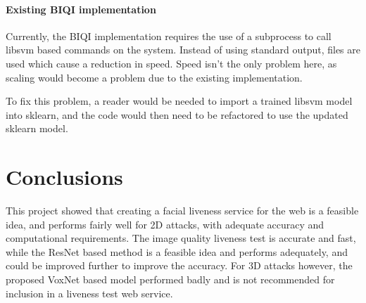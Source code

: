 \documentclass[10pt,a4paper]{article}
\begin{document}
        
        \paragraph{Existing BIQI implementation}
        Currently, the BIQI implementation requires the use of a subprocess to call libsvm based commands on the system. Instead of using standard output, files are used which
        cause a reduction in speed.
        Speed isn't the only problem here, as scaling would become a problem due to the existing implementation. 

        To fix this problem, a reader would be needed to import a trained libsvm model into sklearn, and the code would then need to be refactored to use the updated sklearn model. 

\section{Conclusions}
    This project showed that creating a facial liveness service for the web is a feasible idea, and performs fairly well for 2D attacks, with adequate accuracy and computational requirements.
    The image quality liveness test is accurate and fast, while the ResNet based method is a feasible idea and performs adequately, and could be improved further to improve the accuracy. For 3D attacks however, the
    proposed VoxNet based model performed badly and is not recommended for inclusion in a liveness test web service.


\printglossary


\end{document}
